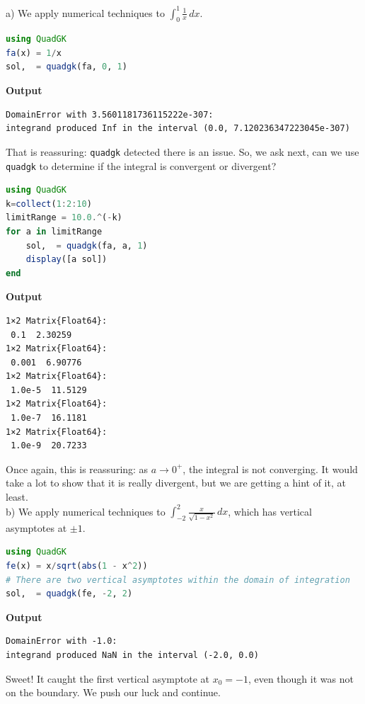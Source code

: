 a) We apply numerical techniques to $\int_0 ^1 \frac{1}{x} \, dx.$

\begin{lstlisting}[language=Julia,style=mystyle]
using QuadGK
fa(x) = 1/x
sol,  = quadgk(fa, 0, 1)
\end{lstlisting}
\textbf{Output} 
\begin{verbatim}
DomainError with 3.5601181736115222e-307:
integrand produced Inf in the interval (0.0, 7.120236347223045e-307)
\end{verbatim}

That is reassuring: \texttt{quadgk} detected there is an issue. So, we ask next, can we use \texttt{quadgk} to determine if the integral is convergent or divergent? 

\begin{lstlisting}[language=Julia,style=mystyle]
using QuadGK
k=collect(1:2:10)
limitRange = 10.0.^(-k)
for a in limitRange
    sol,  = quadgk(fa, a, 1)
    display([a sol])
end
\end{lstlisting}
\textbf{Output} 
\begin{verbatim}
1×2 Matrix{Float64}:
 0.1  2.30259
1×2 Matrix{Float64}:
 0.001  6.90776
1×2 Matrix{Float64}:
 1.0e-5  11.5129
1×2 Matrix{Float64}:
 1.0e-7  16.1181
1×2 Matrix{Float64}:
 1.0e-9  20.7233
\end{verbatim}
Once again, this is reassuring: as $a\to 0^+$, the integral is not converging. It would take a lot to show that it is really divergent, but we are getting a hint of it, at least.\\

b) We apply numerical techniques to $\int_{-2}^2 \frac{x}{\sqrt{1 - x^2}} \, dx$, which has vertical asymptotes at $\pm 1$.
\begin{lstlisting}[language=Julia,style=mystyle]
using QuadGK
fe(x) = x/sqrt(abs(1 - x^2))
# There are two vertical asymptotes within the domain of integration 
sol,  = quadgk(fe, -2, 2) 
\end{lstlisting}
\textbf{Output} 
\begin{verbatim}
DomainError with -1.0:
integrand produced NaN in the interval (-2.0, 0.0)
\end{verbatim}
Sweet! It caught the first vertical asymptote at $x_0 = -1$, even though it was not on the boundary. We push our luck and continue.\\

